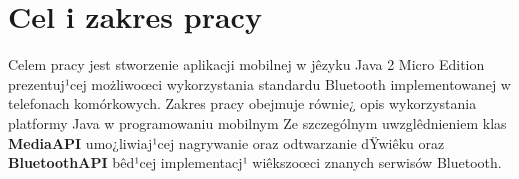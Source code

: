 \chapter{Cel i zakres pracy} \label{sec:Cel i zakres pracy}
Celem pracy jest stworzenie aplikacji
mobilnej w jêzyku Java 2 Micro Edition prezentuj¹cej możliwoœci
wykorzystania standardu Bluetooth implementowanej w telefonach
komórkowych. Zakres pracy obejmuje równie¿ opis wykorzystania
platformy Java w programowaniu mobilnym Ze szczególnym
uwzglêdnieniem klas \textbf{MediaAPI} umo¿liwiaj¹cej nagrywanie oraz
odtwarzanie dŸwiêku oraz \textbf{BluetoothAPI} bêd¹cej implementacj¹
wiêkszoœci znanych serwisów Bluetooth.

